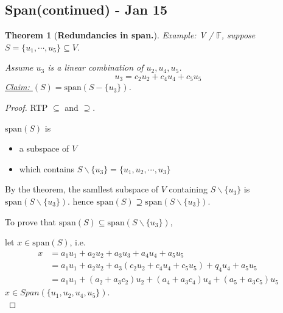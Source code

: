 \documentclass[12pt]{article}
\theoremstyle{plain}
\newtheorem{theorem}{Theorem}[subsection]
\newcommand{\Span}{\mathrm{span}}
\newcommand{\mF}{{\mathbb{F}}}
\begin{document}
	



	\newpage
	\subsection{Span(continued) - Jan 15}
	
	\begin{theorem}[\textbf{Redundancies in span.}]
	Example: V / $\mF$, suppose $S = \{u_1,\cdots, u_5\} \subseteq V$. 
	
	Assume $u_3$ is a linear combination of $u_2, u_4, u_5$. 
	\[
		u_3 = c_2u_2 + c_4u_4 + c_5u_5
	\]
	\underline{Claim: } $(S) = \Span (S - \{u_3\})$.
	\end{theorem}

		\begin{proof}
		RTP $\subseteq$ and $\supseteq$.
	
		$\Span (S)$ is
		\begin{itemize}
			\item a subspace of $V$
			\item which contains $S \backslash \{u_3\} = \{u_1, u_2, \cdots,u_3
				\}$ 
		\end{itemize}
		By the theorem, the samllest subspace of $V$ containing $S \backslash 
		\{u_3\}$ is $\Span(S \backslash \{u_3\})$. 
		hence $\Span(S)\supseteq \Span(S\backslash \{u_3\})$.

		To prove that $\Span(S) \subseteq \Span(S \backslash \{u_3\})$,

		let $x\in \Span(S)$, i.e. 
		\begin{align*}
			x &= a_1u_1 + a_2u_2 + a_3u_3 + a_4u_4 + a_5u_5\\
			  &= a_1u_1 + a_2u_2 + a_3(c_2u_2+c_4u_4+c_5u_5)+q_4u_4+a_5u_5\\
			  &=a_1u_1+(a_2+a_3c_2)u_2+(a_4+a_3c_4)u_4+(a_5+a_3c_5)u_5
		\end{align*}
		$x\in Span(\{u_1,u_2,u_4,u_5\})$. \\
	\end{proof}
\end{document}
